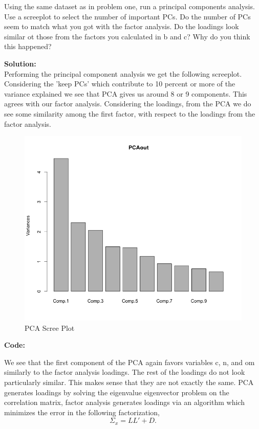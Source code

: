 \documentclass[12pt]{article}
\makeatletter
\theoremstyle{homework}
\newenvironment{exercise}[1]
{\def\@currentlabel{#1}\exercisecore}
{\endexercisecore}
\newcommand{\localhead}[1]{\par\smallskip\noindent\textbf{#1}\nobreak\\}%
\newcommand\solution{\localhead{Solution:}}
\makeatother
\begin{document}
\begin{exercise}{2} Using the same dataset as in problem one, run a principal components analysis. Use a screeplot to select the number of important PCs. 
  Do the number of PCs seem to match what you got with the factor analysis. Do the loadings look similar ot those from the factors you calculated in b and c?
  Why do you think this happened?\\
  \solution Performing the principal component analysis we get the following screeplot. Considering the 'keep PCs' which contribute to 10 percent or more of the variance explained we 
  see that PCA gives us around 8 or 9 components. This agrees with our factor analysis. Considering the loadings, from the PCA we do see some similarity among the first factor, with respect to the 
  loadings from the factor analysis.
  \begin{figure}[H]
    \begin{center}
      \caption{PCA Scree Plot}
    \includegraphics[width = .75\textwidth]{Rplot02.png}
    \end{center}
  \end{figure}
  \textbf{Code:}
  \begin{center}
  
  \end{center}
  \vspace{.15in}

  
  
  
  We see that the first component of the PCA again favors variables c, n, and om similarly to the factor analysis loadings. The rest of the loadings do not look particularly
  similar. This makes sense that they are not exactly the same. PCA generates loadings by solving the eigenvalue eigenvector problem on the correlation matrix, factor analysis generates loadings via an 
  algorithm which minimizes the error in the following factorization, 
  \begin{equation*}
    \Sigma_x = LL' + D. 
  \end{equation*}
  
\end{exercise}
\vspace{1in} 
\end{document}
